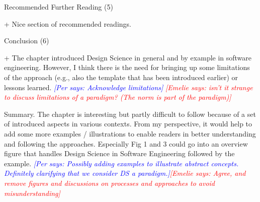 \documentclass{article}
\newcommand{\emelie}[1]{\textcolor{red}{{\it [Emelie says: #1]}}}
\newcommand{\per}[1]{\textcolor{blue}
        	{{\it [Per says: #1]}}}
\newcommand{\emelie}[1]{}
\newcommand{\per}[1]{}
\begin{document}
Recommended Further Reading (5)

+ Nice section of recommended readings.

Conclusion (6)

+ The chapter introduced Design Science in general and by example in software engineering. However, I think there is the need for bringing up some limitations of the approach (e.g., also the template that has been introduced earlier) or lessons learned. \per{Acknowledge limitations} \emelie{isn't it strange to discuss limitations of a paradigm? (The norm is part of the paradigm)}

Summary. The chapter is interesting but partly difficult to follow because of a set of introduced aspects in various contexts. From my perspective, it would help to add some more examples / illustrations to enable readers in better understanding and following the approaches. Especially Fig 1 and 3 could go into an overview figure that handles Design Science in Software Engineering followed by the example. \per{Possibly adding examples to illustrate abstract concepts. Definitely clarifying that we consider DS a paradigm.}\emelie{Agree, and remove figures and discussions on processes and approaches to avoid misunderstanding}
\end{document}
